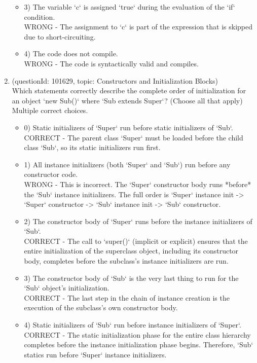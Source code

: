 \documentclass[12pt]{article}
\begin{document}
\begin{enumerate}[label=(\arabic*)]
\begin{itemize}
\item 3) The variable `c` is assigned `true` during the evaluation of the `if` condition.
 \\ 
WRONG - The assignment to `c` is part of the expression that is skipped due to short-circuiting.

\item 4) The code does not compile.
 \\ 
WRONG - The code is syntactically valid and compiles.

\end{itemize}
\item (questionId: 101629, topic: Constructors and Initialization Blocks) \\ 
Which statements correctly describe the complete order of initialization for an object `new Sub()` where `Sub extends Super`? (Choose all that apply)
\\ \noindent Multiple correct choices. 
\begin{itemize}
\item 0) Static initializers of `Super` run before static initializers of `Sub`.
 \\ 
CORRECT - The parent class `Super` must be loaded before the child class `Sub`, so its static initializers run first.

\item 1) All instance initializers (both `Super` and `Sub`) run before any constructor code.
 \\ 
WRONG - This is incorrect. The `Super` constructor body runs *before* the `Sub` instance initializers. The full order is `Super` instance init -> `Super` constructor -> `Sub` instance init -> `Sub` constructor.

\item 2) The constructor body of `Super` runs before the instance initializers of `Sub`.
 \\ 
CORRECT - The call to `super()` (implicit or explicit) ensures that the entire initialization of the superclass object, including its constructor body, completes before the subclass's instance initializers are run.

\item 3) The constructor body of `Sub` is the very last thing to run for the `Sub` object's initialization.
 \\ 
CORRECT - The last step in the chain of instance creation is the execution of the subclass's own constructor body.

\item 4) Static initializers of `Sub` run before instance initializers of `Super`.
 \\ 
CORRECT - The static initialization phase for the entire class hierarchy completes before the instance initialization phase begins. Therefore, `Sub` statics run before `Super` instance initializers.


\end{itemize}
\end{enumerate}
\end{document}
